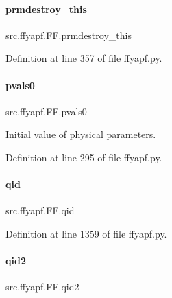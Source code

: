 \paragraph{\texorpdfstring{prmdestroy\+\_\+this}{prmdestroy\_this}}
{\footnotesize\ttfamily src.\+ffyapf.\+F\+F.\+prmdestroy\+\_\+this}



Definition at line 357 of file ffyapf.\+py.

\mbox{\label{classsrc_1_1ffyapf_1_1FF_af59602ddb21a54c130b0b732e99eae67}} 
\paragraph{\texorpdfstring{pvals0}{pvals0}}
{\footnotesize\ttfamily src.\+ffyapf.\+F\+F.\+pvals0}



Initial value of physical parameters. 



Definition at line 295 of file ffyapf.\+py.

\mbox{\label{classsrc_1_1ffyapf_1_1FF_a59eed571d6673a73cabc156bc82dc73b}} 
\paragraph{\texorpdfstring{qid}{qid}}
{\footnotesize\ttfamily src.\+ffyapf.\+F\+F.\+qid}



Definition at line 1359 of file ffyapf.\+py.

\mbox{\label{classsrc_1_1ffyapf_1_1FF_a7a77e7aeb6678815e269096d33080842}} 
\paragraph{\texorpdfstring{qid2}{qid2}}
{\footnotesize\ttfamily src.\+ffyapf.\+F\+F.\+qid2}



